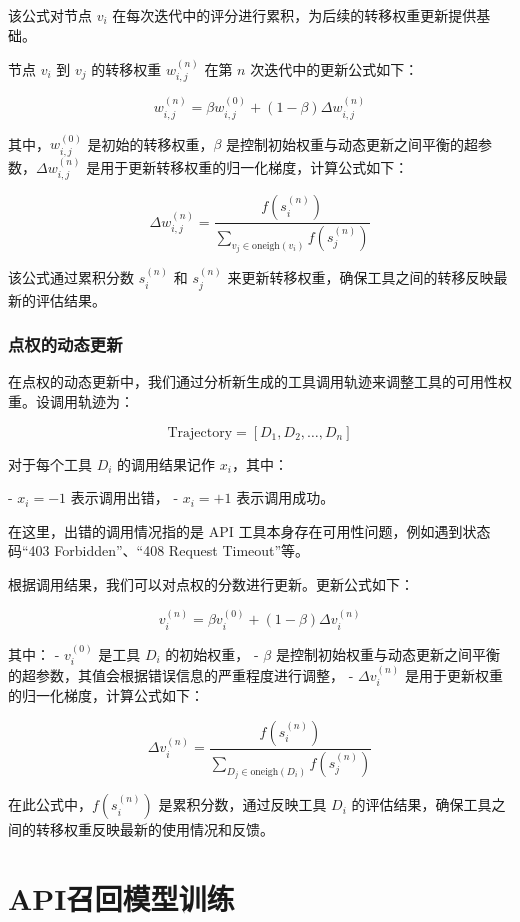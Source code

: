 该公式对节点 \( v_i \) 在每次迭代中的评分进行累积，为后续的转移权重更新提供基础。

节点 \( v_i \) 到 \( v_j \) 的转移权重 \( w_{i,j}^{(n)} \) 在第 \( n \) 次迭代中的更新公式如下：

\[
w_{i,j}^{(n)} = \beta w_{i,j}^{(0)} + (1 - \beta) \Delta w_{i,j}^{(n)}
\]

其中，\( w_{i,j}^{(0)} \) 是初始的转移权重，\( \beta \) 是控制初始权重与动态更新之间平衡的超参数，\( \Delta w_{i,j}^{(n)} \) 是用于更新转移权重的归一化梯度，计算公式如下：

\[
\Delta w_{i,j}^{(n)} = \frac{f(s_i^{(n)})}{\sum_{v_j \in \text{oneigh}(v_i)} f(s_j^{(n)})}
\]

该公式通过累积分数 \( s_i^{(n)} \) 和 \( s_j^{(n)} \) 来更新转移权重，确保工具之间的转移反映最新的评估结果。

\subsubsection{点权的动态更新}

在点权的动态更新中，我们通过分析新生成的工具调用轨迹来调整工具的可用性权重。设调用轨迹为：

\[
\text{Trajectory} = [D_1, D_2, \ldots, D_n]
\]

对于每个工具 \( D_i \) 的调用结果记作 \( x_i \)，其中：

- \( x_i = -1 \) 表示调用出错，
- \( x_i = +1 \) 表示调用成功。

在这里，出错的调用情况指的是 API 工具本身存在可用性问题，例如遇到状态码“403 Forbidden”、“408 Request Timeout”等。

根据调用结果，我们可以对点权的分数进行更新。更新公式如下：

\[
v_i^{(n)} = \beta v_i^{(0)} + (1 - \beta) \Delta v_i^{(n)}
\]

其中：
- \( v_i^{(0)} \) 是工具 \( D_i \) 的初始权重，
- \( \beta \) 是控制初始权重与动态更新之间平衡的超参数，其值会根据错误信息的严重程度进行调整，
- \( \Delta v_i^{(n)} \) 是用于更新权重的归一化梯度，计算公式如下：

\[
\Delta v_i^{(n)} = \frac{f(s_i^{(n)})}{\sum_{D_j \in \text{oneigh}(D_i)} f(s_j^{(n)})}
\]

在此公式中，$f(s_i^{(n)})$ 是累积分数，通过反映工具 \( D_i \) 的评估结果，确保工具之间的转移权重反映最新的使用情况和反馈。

\section{API召回模型训练}

